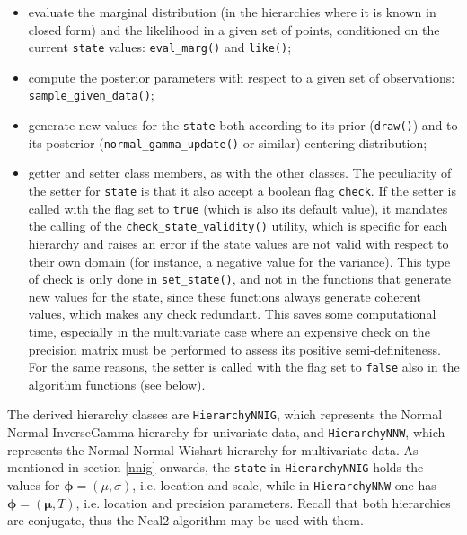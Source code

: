 \begin{itemize}
	\item evaluate the marginal distribution (in the hierarchies where it is known in closed form) and the likelihood in a given set of points, conditioned on the current \verb|state| values: \verb|eval_marg()| and \verb|like()|;
	\item compute the posterior parameters with respect to a given set of observations: \verb|sample_given_data()|;
	\item generate new values for the \verb|state| both according to its prior (\verb|draw()|) and to its posterior (\verb|normal_gamma_update()| or similar) centering distribution;
	\item getter and setter class members, as with the other classes.
	The peculiarity of the setter for \verb|state| is that it also accept a boolean flag \verb|check|.
	If the setter is called with the flag set to \verb|true| (which is also its default value), it mandates the calling of the \verb|check_state_validity()| utility, which is specific for each hierarchy and raises an error if the state values are not valid with respect to their own domain (for instance, a negative value for the variance).
	This type of check is only done in \verb|set_state()|, and not in the functions that generate new values for the state, since these functions always generate coherent values, which makes any check redundant.
	This saves some computational time, especially in the multivariate case where an expensive check on the precision matrix must be performed to assess its positive semi-definiteness.
	For the same reasons, the setter is called with the flag set to \verb|false| also in the algorithm functions (see below).
\end{itemize}
The derived hierarchy classes are \verb|HierarchyNNIG|, which represents the Normal Normal-InverseGamma hierarchy for univariate data, and \verb|HierarchyNNW|, which represents the Normal Normal-Wishart hierarchy for multivariate data.
As mentioned in section \ref{nnig} onwards, the \verb|state| in \verb|HierarchyNNIG| holds the values for $\boldsymbol\phi = (\mu,\sigma)$, i.e.  location and scale, while in \verb|HierarchyNNW| one has $\boldsymbol\phi = (\boldsymbol\mu,T)$, i.e. location and precision parameters.
Recall that both hierarchies are conjugate, thus the Neal2 algorithm may be used with them.
